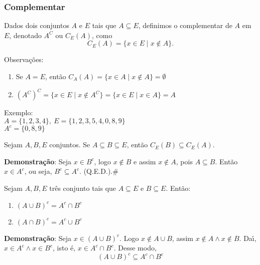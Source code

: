 \subsubsection{Complementar}

\begin{definicao}[Complementar] Dados dois conjuntos $A$ e $E$ tais que $A\subseteq E$, definimos o complementar de $A$ em $E$, denotado $A^{C}$ ou $C_{E}(A)$, como
\[C_{E}(A) = \{ x \in E \mid x \notin A \}.\]
\end{definicao}

Observa{\c c}{\~o}es:
\begin{enumerate}
\item Se $A = E$, ent{\~a}o $C_{A}(A)=\{ x \in A \mid x \notin A \}=\emptyset$
\item $(A^{C})^{C}=\{x \in E \mid x \notin A^{C}\} = \{ x \in E \mid x \in A \}=A$
\end{enumerate}

Exemplo:\\
$A=\{1,2,3,4\},\ E=\{1,2,3,5,4,0,8,9\}$\\
$A^{c}=\{0,8,9\}$

\begin{proposicao} Sejam $A,B,E$ conjuntos. Se $A\subseteq B\subseteq E$, ent{\~a}o $C_{E}(B)\subseteq C_{E}(A)$.\end{proposicao}

\textbf{Demonstra{\c c}{\~a}o}: Seja $x\in B^{c}$, logo $x\notin B$ e assim $x\notin A$, pois $A\subseteq B$. Ent{\~a}o $x\in A^{c}$, ou seja, $B^{c}\subseteq A^{c}$. (Q.E.D.).\#\\

\begin{proposicao} Sejam $A,B,E$ tr{\^e}s conjunto tais que $A\subseteq E$ e $B\subseteq E$. Ent{\~a}o:
\begin{enumerate}
\item $(A\cup B)^{c}=A^{c}\cap B^{c}$
\item $(A\cap B)^{c}=A^{c}\cup B^{c}$
\end{enumerate}
\end{proposicao}

\textbf{Demonstra{\c c}{\~a}o}: Seja $x\in(A\cup B)^{c}$. Logo $x\notin A\cup B$, assim $x\notin A\wedge x\notin B$. Da{\'\i}, $x\in A^{c}\wedge x\in B^{c}$, isto {\'e}, $x\in A^{c}\cap B^{c}$. Desse modo,
\begin{equation}
(A\cup B)^{c}\subseteq A^{c}\cap B^{c}
\end{equation}

